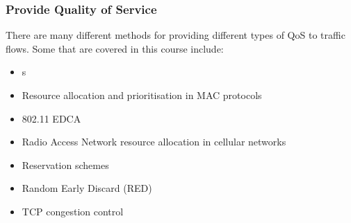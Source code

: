 \subsubsection{Provide Quality of Service}\label{subsubsec:Provide_QoS}
There are many different methods for providing different types of QoS to traffic flows.
Some that are covered in this course include:
\begin{itemize}[noitemsep]
\item {}s
\item Resource allocation and prioritisation in MAC protocols
\item 802.11 EDCA
\item Radio Access Network resource allocation in cellular networks
\item Reservation schemes
\item Random Early Discard (RED)
\item TCP congestion control
\end{itemize}






